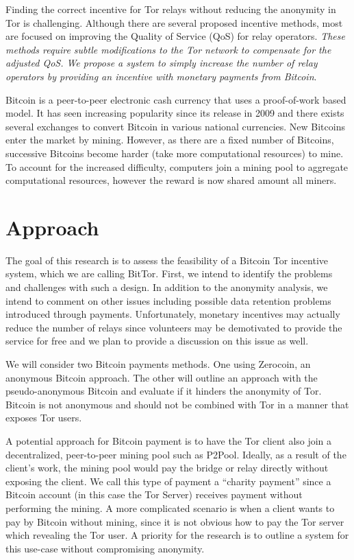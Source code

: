\documentclass[letterpaper]{article}
\begin{document}
Finding the correct incentive for Tor relays without reducing the
anonymity in Tor is challenging.  Although there are several proposed
incentive methods, most are focused on improving the Quality of
Service (QoS) for relay operators.  \emph{These methods require subtle
modifications to the Tor network to compensate for the adjusted QoS.
We propose a system to simply increase the number of relay operators
by providing an incentive with monetary payments from Bitcoin}.

Bitcoin is a peer-to-peer electronic cash currency that uses a
proof-of-work based model\cite{nakamoto2009bitcoin}.  It has seen
increasing popularity since its release in 2009 and there exists
several exchanges to convert Bitcoin in various national currencies.
New Bitcoins enter the market by mining.  However, as there are a
fixed number of Bitcoins, successive Bitcoins become harder (take more
computational resources) to mine.  To account for the increased
difficulty, computers join a mining
pool\cite{DBLP:journals/corr/abs-1112-4980} to aggregate computational
resources, however the reward is now shared amount all miners.


\section*{Approach}\label{sec:approach}

The goal of this research is to assess the feasibility of a Bitcoin
Tor incentive system, which we are calling BitTor.  First, we intend
to identify the problems and challenges with such a design.  In
addition to the anonymity analysis, we intend to comment on other
issues including possible data retention problems introduced through
payments\cite{data-retention}.  Unfortunately, monetary incentives may
actually reduce the number of relays since volunteers may be
demotivated to provide the service for
free\cite{RePEc:eee:joepsy:v:30:y:2009:i:3:p:500-508} and we plan to
provide a discussion on this issue as well.


We will consider two Bitcoin payments
methods.  One using Zerocoin\cite{Miers:2013:ZAD:2497621.2498124}, an
anonymous Bitcoin approach.  The other will outline an approach with
the pseudo-anonymous Bitcoin and evaluate if it hinders the anonymity
of Tor.  Bitcoin is not anonymous\cite{journals/iacr/AndroulakiKRSC12}
and should not be combined with Tor in a manner that exposes Tor users.

A potential approach for Bitcoin payment is to have the Tor client
also join a decentralized, peer-to-peer mining pool such as P2Pool.
Ideally, as a result of the client's work, the mining pool would pay
the bridge or relay directly without exposing the client.  We call
this type of payment a ``charity payment'' since a Bitcoin account (in
this case the Tor Server) receives payment without performing the
mining.  A more complicated scenario is when a client wants to pay by
Bitcoin without mining, since it is not obvious how to pay the Tor
server which revealing the Tor user.  A priority for the research is
to outline a system for this use-case without compromising anonymity.
\end{document}
